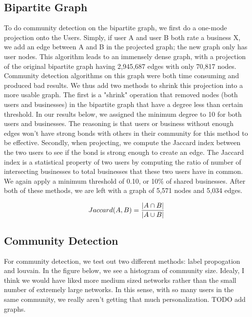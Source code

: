 \documentclass[10pt]{article}
\begin{document}
\subsection{Bipartite Graph}

To do community detection on the bipartite graph, we first do a one-mode projection onto the Users.  Simply, if user A and user B both rate a business X, we add an edge between A and B in the projected graph; the new graph only has user nodes.  This algorithm leads to an immensely dense graph, with a projection of the original bipartite graph having 2,945,687 edges with only 70,817 nodes.  Community detection algorithms on this graph were both time consuming and produced bad results.  We thus add two methods to shrink this projection into a more usable graph.  The first is a "shrink" operation that removed nodes (both users and businesses) in the bipartite graph that have a degree less than certain threshold.  In our results below, we assigned the minimum degree to 10 for both users and businesses.  The reasoning is that users or business without enough edges won't have strong bonds with others in their community for this method to be effective. Secondly, when projecting, we compute the Jaccard index between the two users to see if the bond is strong enough to create an edge.  The Jaccard index is a statistical property of two users by computing the ratio of number of intersecting businesses to total businesses that these two users have in common.  We again apply a minimum threshold of 0.10, or 10\% of shared businesses.  After both of these methods, we are left with a graph of 5,571 nodes and 5,034 edges.

\begin{equation}
Jaccard(A,B) = {{|A \cap B|}\over{|A \cup B|}}
\end{equation}

\subsection{Community Detection}

For community detection, we test out two different methods: label propogation\cite{gregory2010finding} and louvain\cite{blondel2008fast}.  In the figure below, we see a histogram of community size.  Idealy, I think we would have liked more medium sized networks rather than the small number of extremely large networks.  In this sense, with so many users in the same community, we really aren't getting that much personalization.  TODO add graphs.
\end{document}
